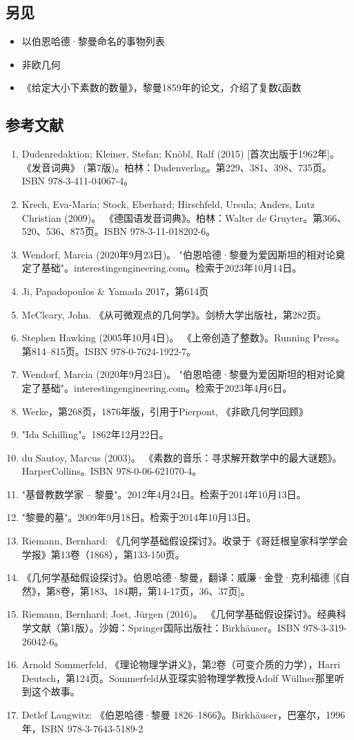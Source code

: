\subsection{另见}
\begin{itemize}
\item 以伯恩哈德·黎曼命名的事物列表
\item 非欧几何
\item 《给定大小下素数的数量》，黎曼1859年的论文，介绍了复数ζ函数
\end{itemize}
\subsection{参考文献}
\begin{enumerate}
\item Dudenredaktion; Kleiner, Stefan; Knöbl, Ralf (2015) [首次出版于1962年]。 《发音词典》 (第7版)。柏林：Dudenverlag。第229、381、398、735页。ISBN 978-3-411-04067-4。
\item Krech, Eva-Maria; Stock, Eberhard; Hirschfeld, Ursula; Anders, Lutz Christian (2009)。 《德国语发音词典》。柏林：Walter de Gruyter。第366、520、536、875页。ISBN 978-3-11-018202-6。
\item Wendorf, Marcia (2020年9月23日)。 "伯恩哈德·黎曼为爱因斯坦的相对论奠定了基础"。interestingengineering.com。检索于2023年10月14日。
\item Ji, Papadopoulos & Yamada 2017，第614页
\item McCleary, John. 《从可微观点的几何学》。剑桥大学出版社，第282页。
\item Stephen Hawking (2005年10月4日)。 《上帝创造了整数》。Running Press。第814–815页。ISBN 978-0-7624-1922-7。
\item Wendorf, Marcia (2020年9月23日)。 "伯恩哈德·黎曼为爱因斯坦的相对论奠定了基础"。interestingengineering.com。检索于2023年4月6日。
\item Werke，第268页，1876年版，引用于Pierpont, 《非欧几何学回顾》
\item "Ida Schilling"。1862年12月22日。
\item du Sautoy, Marcus (2003)。 《素数的音乐：寻求解开数学中的最大谜题》。HarperCollins。ISBN 978-0-06-621070-4。
\item "基督教数学家 – 黎曼"。2012年4月24日。检索于2014年10月13日。
\item "黎曼的墓"。2009年9月18日。检索于2014年10月13日。
\item Riemann, Bernhard: 《几何学基础假设探讨》。收录于《哥廷根皇家科学学会学报》第13卷（1868），第133-150页。
\item 《几何学基础假设探讨》。伯恩哈德·黎曼，翻译：威廉·金登·克利福德 [《自然》，第8卷，第183、184期，第14-17页，36、37页]。
\item Riemann, Bernhard; Jost, Jürgen (2016)。 《几何学基础假设探讨》。经典科学文献（第1版）。沙姆：Springer国际出版社：Birkhäuser。ISBN 978-3-319-26042-6。
\item Arnold Sommerfeld, 《理论物理学讲义》，第2卷（可变介质的力学），Harri Deutsch，第124页。Sommerfeld从亚琛实验物理学教授Adolf Wüllner那里听到这个故事。
\item Detlef Laugwitz: 《伯恩哈德·黎曼 1826–1866》。Birkhäuser，巴塞尔，1996年，ISBN 978-3-7643-5189-2
\end{enumerate}
